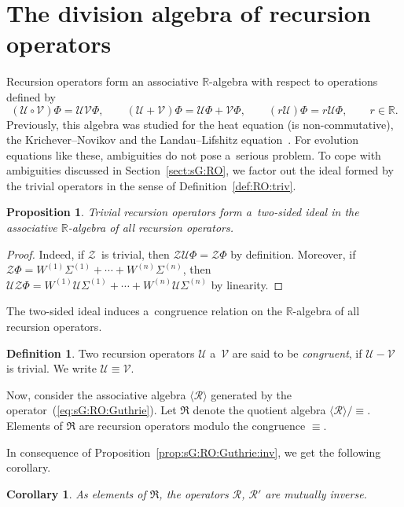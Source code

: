 \documentclass[pdftex]{sigma}
\def\eqref#1{{\rm(\ref{#1})}}
\def\RR{{\mathbb R}}
\def\U{{\mathcal U}}
\def\V{{\mathcal V}}
\def\RO{{\mathcal R}}
\def\Z{{\mathcal Z}}
\numberwithin{equation}{section}
\newtheorem{Corollary}[Theorem]{Corollary}
\newtheorem{Proposition}[Theorem]{Proposition}
\theoremstyle{definition}
\newtheorem{Definition}[Theorem]{Definition}
\begin{document}
\section{The division algebra of recursion operators}
\label{sect:dig}

Recursion operators form an associative $\RR$-algebra
with respect to operations defined by
\[
(\U \circ \V)\Phi = \U\V\Phi, \qquad
(\U + \V)\Phi = \U \Phi + \V \Phi, \qquad
(r \U)\Phi = r \U\Phi, \qquad r \in \RR.
\]
Previously, this algebra was studied for the heat equation
\cite{SDK-ROP-2023,ISK-AMV-1989,JK-AV-RV-2017}
(is non-commutative),
the Krichever--Novikov and the Landau--Lifshitz equation~\cite{D-S-2008}.
For evolution equations like these, ambiguities do not pose a~serious problem.
To cope with ambiguities discussed in Section~\ref{sect:sG:RO},
we factor out the ideal formed by the trivial operators in the sense of
Definition~\ref{def:RO:triv}.

\begin{Proposition}
Trivial recursion operators form a~two-sided ideal in the associative
$\RR$-algebra of all recursion operators.
\end{Proposition}


\begin{proof}
Indeed, if $\Z$ is trivial, then $\Z\U\Phi = \Z\Phi$ by definition.
Moreover, if
$\Z\Phi = W^{(1)} \Sigma^{(1)} + \cdots + W^{(n)} \Sigma^{(n)}$, then
$\U\Z\Phi = W^{(1)} \U\Sigma^{(1)} + \cdots + W^{(n)} \U\Sigma^{(n)}$
by linearity.
\end{proof}



The two-sided ideal induces a~congruence relation on the $\RR$-algebra
of all recursion operators.


\begin{Definition}
Two recursion operators $\U$ a~$\V$ are said to be {\it congruent},
if $\U - \V$ is trivial.
We write $\U \equiv \V$.
\end{Definition}

Now, consider the associative algebra $\langle\RO\rangle$ generated by
the operator~\eqref{eq:sG:RO:Guthrie}.
Let $\mathfrak R$ denote the quotient algebra
$\langle\RO\rangle/{\equiv}$.
Elements of $\mathfrak R$ are recursion operators modulo the congruence
$\equiv$.

In consequence of Proposition~\ref{prop:sG:RO:Guthrie:inv},
we get the following corollary.


\begin{Corollary}
As elements of $\mathfrak R$, the operators $\RO$, $\RO'$ are
mutually inverse.
\end{Corollary}
\end{document}
